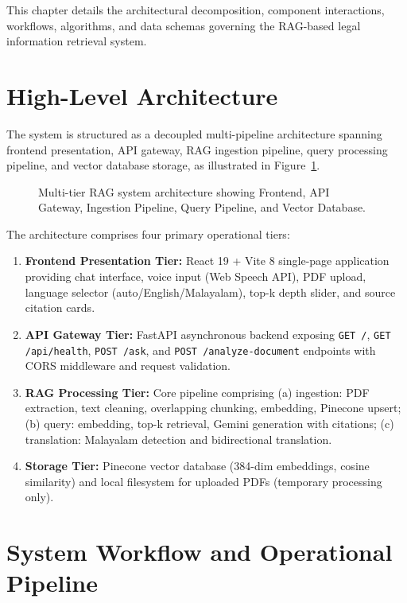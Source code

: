 \documentclass[12pt,a4paper]{report}
\begin{document}
This chapter details the architectural decomposition, component interactions, workflows, algorithms, and data schemas governing the RAG-based legal information retrieval system.

\section{High-Level Architecture}
The system is structured as a decoupled multi-pipeline architecture spanning frontend presentation, API gateway, RAG ingestion pipeline, query processing pipeline, and vector database storage, as illustrated in Figure~\ref{fig:system_arch_detailed}.

\begin{figure}[H]
    \centering
    \caption{Multi-tier RAG system architecture showing Frontend, API Gateway, Ingestion Pipeline, Query Pipeline, and Vector Database.}
    \label{fig:system_arch_detailed}
\end{figure}

The architecture comprises four primary operational tiers:
\begin{enumerate}
    \item \textbf{Frontend Presentation Tier:} React 19 + Vite 8 single-page application providing chat interface, voice input (Web Speech API), PDF upload, language selector (auto/English/Malayalam), top-k depth slider, and source citation cards.
    \item \textbf{API Gateway Tier:} FastAPI asynchronous backend exposing \texttt{GET /}, \texttt{GET /api/health}, \texttt{POST /ask}, and \texttt{POST /analyze-document} endpoints with CORS middleware and request validation.
    \item \textbf{RAG Processing Tier:} Core pipeline comprising (a) ingestion: PDF extraction, text cleaning, overlapping chunking, embedding, Pinecone upsert; (b) query: embedding, top-k retrieval, Gemini generation with citations; (c) translation: Malayalam detection and bidirectional translation.
    \item \textbf{Storage Tier:} Pinecone vector database (384-dim embeddings, cosine similarity) and local filesystem for uploaded PDFs (temporary processing only).
\end{enumerate}

\section{System Workflow and Operational Pipeline}
\end{document}
